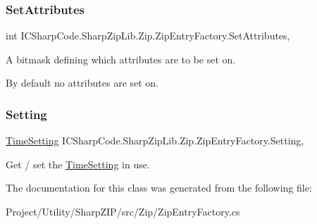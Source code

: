 \subsubsection{\texorpdfstring{Set\+Attributes}{SetAttributes}}
{\footnotesize\ttfamily int I\+C\+Sharp\+Code.\+Sharp\+Zip\+Lib.\+Zip.\+Zip\+Entry\+Factory.\+Set\+Attributes\hspace{0.3cm}{\ttfamily [get]}, {\ttfamily [set]}}



A bitmask defining which attributes are to be set on. 

By default no attributes are set on.\mbox{\label{class_i_c_sharp_code_1_1_sharp_zip_lib_1_1_zip_1_1_zip_entry_factory_a24146ff4b08ed14235b6055ba047e72a}} 
\subsubsection{\texorpdfstring{Setting}{Setting}}
{\footnotesize\ttfamily \hyperlink{class_i_c_sharp_code_1_1_sharp_zip_lib_1_1_zip_1_1_zip_entry_factory_a10d0f2a1e64abd09ea6abac4d34a9955}{Time\+Setting} I\+C\+Sharp\+Code.\+Sharp\+Zip\+Lib.\+Zip.\+Zip\+Entry\+Factory.\+Setting\hspace{0.3cm}{\ttfamily [get]}, {\ttfamily [set]}}



Get / set the \hyperlink{class_i_c_sharp_code_1_1_sharp_zip_lib_1_1_zip_1_1_zip_entry_factory_a10d0f2a1e64abd09ea6abac4d34a9955}{Time\+Setting} in use. 



The documentation for this class was generated from the following file\+:\begin{DoxyCompactItemize}
\item 
Project/\+Utility/\+Sharp\+Z\+I\+P/src/\+Zip/Zip\+Entry\+Factory.\+cs\end{DoxyCompactItemize}
